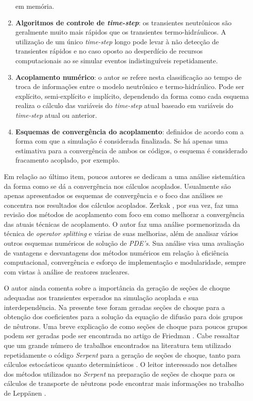 \begin{enumerate}
em memória. 
\item \textbf{Algoritmos de controle de \textit{time-step}}: os transientes neutrônicos são geralmente muito mais rápidos que 
os transientes termo-hidráulicos. A utilização de um único \textit{time-step} longo pode levar à não detecção de transientes 
rápidos e no caso oposto ao desperdício de recursos computacionais ao se simular eventos indistinguíveis repetidamente.
\item \textbf{Acoplamento numérico}: o autor se refere nesta classificação ao tempo de troca de informações entre o modelo 
neutrônico e termo-hidráulico. Pode ser explícito, semi-explícito e implícito, dependendo da forma como cada esquema 
realiza o cálculo das variáveis do \textit{time-step} atual baseado em variáveis do \textit{time-step} atual ou 
anterior.
\item \textbf{Esquemas de convergência do acoplamento}: definidos de acordo com a forma com que a simulação é considerada 
finalizada. Se há apenas uma estimativa para a convergência de ambos os códigos, o esquema é considerado fracamento 
acoplado, por exemplo.  
\end{enumerate}

Em relação ao último item, poucos autores se dedicam a uma análise sistemática da forma como se
dá a convergência nos cálculos acoplados. Usualmente são apenas apresentados os esquemas
de convergência e o foco das análises se concentra nos resultados dos cálculos acoplados.
Zerkak \cite{Zerkak2015}, por sua vez, faz uma revisão dos métodos de acoplamento com
foco em como melhorar a convergência das atuais técnicas de acoplamento. O autor faz uma
análise pormenorizada da técnica de \textit{operator splitting} e várias de suas melhorias,
além de analisar vários outros esquemas numéricos de solução de \textit{PDE's}. Sua análise visa
uma avaliação de vantagens e desvantagens dos métodos numéricos em relação à eficiência
computacional, convergência e esforço de implementação e modularidade, sempre com vistas
à análise de reatores nucleares.

O autor ainda comenta sobre a importância da geração de seções de choque adequadas aos transientes esperados na 
simulação acoplada e sua interdependência. Na presente tese foram geradas seções de choque para a obtenção dos
coeficientes para a solução da equação de difusão para dois grupos de nêutrons.
Uma breve explicação de como seções de choque para poucos grupos podem ser geradas pode ser encontrada no
artigo de Friedman \cite{Friedman2013}. Cabe ressaltar que um grande número de trabalhos encontrados
na literatura tem utilizado repetidamente o código \textit{Serpent} \cite{Serpent2013} para
a geração de seções de choque, tanto para cálculos estocásticos quanto determinísticos \cite{Jareteg2014}. O leitor interessado nos detalhes dos métodos utilizados no \textit{Serpent} na
preparação de seções de choque para os cálculos de transporte de nêutrons pode encontrar mais informações no trabalho de Leppänen \cite{Leppanen2009}.

